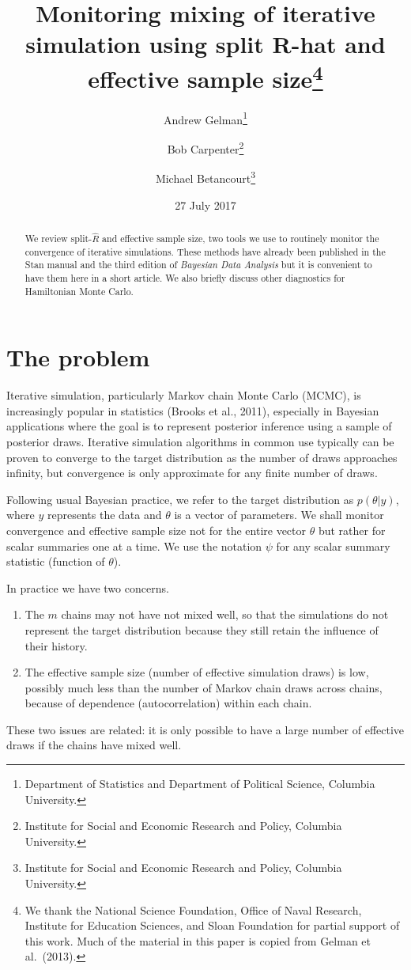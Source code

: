 \documentclass[11pt]{article}
\title{\bf Monitoring mixing of iterative simulation using split R-hat and effective sample size\footnote{We thank the National Science Foundation, Office of Naval Research, Institute for Education Sciences, and Sloan Foundation for partial support of this work. Much of the material in this paper is copied from Gelman et al.\ (2013).}\vspace{.1in}}
\author{Andrew Gelman\footnote{Department of Statistics and Department of Political Science, Columbia University.} \and Bob Carpenter\footnote{Institute for Social and Economic Research and Policy, Columbia University.} \and Michael Betancourt\footnote{Institute for Social and Economic Research and Policy, Columbia University.}\vspace{.1in}}
\date{27 July 2017\vspace{-.1in}}
\begin{document}
\sloppy
\maketitle
\thispagestyle{empty}

\begin{abstract}
We review split-$\widehat{R}$ and effective sample size, two tools we use to routinely monitor the convergence of iterative simulations.  These methods have already been published in the Stan manual and the third edition of {\em Bayesian Data Analysis} but it is convenient to have them here in a short article.  We also briefly discuss other diagnostics for Hamiltonian Monte Carlo.
\end{abstract}

\section{The problem}\label{intro}

Iterative simulation, particularly Markov chain Monte Carlo (MCMC), is increasingly popular in statistics (Brooks et al., 2011), especially in Bayesian applications where the goal is to represent posterior inference using a sample of posterior draws.  Iterative simulation algorithms in common use typically can be proven to converge to the target distribution as the number of draws approaches infinity, but convergence is only approximate for any finite number of draws.

Following usual Bayesian practice, we refer to the target distribution as $p(\theta|y)$, where $y$ represents the data and $\theta$ is a vector of parameters.  We shall monitor convergence and effective sample size not for the entire vector $\theta$ but rather for scalar summaries one at a time.  We use the notation $\psi$ for any scalar summary statistic (function of $\theta$).

In practice we have two concerns.
\begin{enumerate}
\item The $m$ chains may not have not mixed well, so that the simulations do not represent the target distribution because they still retain the influence of their history.
\item The effective sample size (number of effective simulation draws) is low, possibly much less than the number of Markov chain draws across chains, because of dependence (autocorrelation) within each chain.
\end{enumerate}
%
These two issues are related: it is only possible to have a large number of effective draws if the chains have mixed well.
\end{document}
